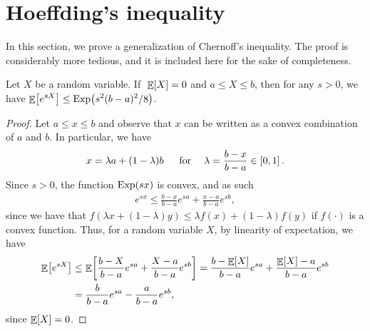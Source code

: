 \section{Hoeffding's inequality}

In this section, we prove a generalization of Chernoff's
inequality. The proof is considerably more tedious, and it is included
here for the sake of completeness.

\begin{lemma}
    Let $X$ be a random variable.  If $\;\mathop{\mathbb{E}}\!\left[ {X} \right]=0$ and $a\le X\le b$,
    then for any $s > 0$, we have $\displaystyle \Ex{ e^{sX} } \le
    \Exp\pth{ s^{2}(b-a)^{2} / 8 }$.

\end{lemma}
\begin{proof}
    Let $a\le x \le b$ and observe that $x$ can be written as a convex
    combination of $a$ and $b$. In particular, we have
    \begin{align*}
        x = \lambda a + (1-\lambda) b \text{\;\; ~ for ~\; } \lambda =
        \frac{b-x}{b-a} \in \left[ { 0,1 } \right].
    \end{align*}
    Since $s > 0$, the function $\mathrm{Exp}(sx)$ is convex, and as such
    \begin{align*}
        e^{sx} \le \frac{b-x}{b-a} e^{sa} + \frac{x-a}{b-a} e^{sb},
    \end{align*}
    since we have that $f(\lambda x + (1-\lambda) y) \leq \lambda f(x)
    + (1-\lambda) f(y)$ if $f(\cdot)$ is a convex function.  Thus, for
    a random variable $X$, by linearity of expectation, we have
    \begin{align*}
        \Ex{e^{sX}}
        &\le \Ex{ \frac{b-X}{b-a} e^{sa} +
           \frac{X-a}{b-a} e^{sb}} 
        = \frac{b - \Ex{X}}{b-a}e^{sa} + \frac{\Ex{X} -
           a}{b-a}{e^{sb}}%
        \\%
        &=%
        \frac{b }{b-a}e^{sa} - \frac{  a}{b-a}{e^{sb}},
    \end{align*}
    since $\mathop{\mathbb{E}}\!\left[ {X} \right] = 0$. 


\end{proof}
